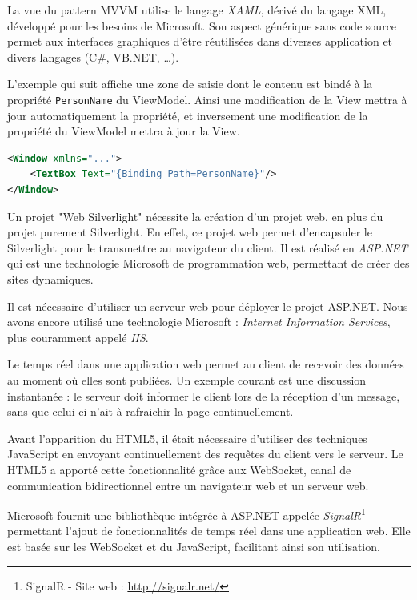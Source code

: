 La vue du pattern MVVM utilise le langage \textit{XAML}, dérivé du langage XML, développé pour les besoins de Microsoft.
Son aspect générique sans code source permet aux interfaces graphiques d'être réutilisées dans diverses application et divers langages (C\#, VB.NET, \ldots).

L'exemple qui suit affiche une zone de saisie dont le contenu est bindé à la propriété \lstinline{PersonName} du ViewModel.
Ainsi une modification de la View mettra à jour automatiquement la propriété, et inversement une modification de la propriété du ViewModel mettra à jour la View.
\begin{lstlisting}[language = xml]
<Window xmlns="...">
	<TextBox Text="{Binding Path=PersonName}"/>
</Window>
\end{lstlisting}



Un projet "Web Silverlight" nécessite la création d'un projet web, en plus du projet purement Silverlight.
En effet, ce projet web permet d'encapsuler le Silverlight pour le transmettre au navigateur du client.
Il est réalisé en \textit{ASP.NET} qui est une technologie Microsoft de programmation web, permettant de créer des sites dynamiques.

Il est nécessaire d'utiliser un serveur web pour déployer le projet ASP.NET.
Nous avons encore utilisé une technologie Microsoft : \textit{Internet Information Services}, plus couramment appelé \textit{IIS}.



Le temps réel dans une application web permet au client de recevoir des données au moment où elles sont publiées.
Un exemple courant est une discussion instantanée : le serveur doit informer le client lors de la réception d'un message, sans que celui-ci n'ait à rafraichir la page continuellement.

Avant l'apparition du HTML5, il était nécessaire d'utiliser des techniques JavaScript en envoyant continuellement des requêtes du client vers le serveur.
Le HTML5 a apporté cette fonctionnalité grâce aux WebSocket, canal de communication bidirectionnel entre un navigateur web et un serveur web.

Microsoft fournit une bibliothèque intégrée à ASP.NET appelée \textit{SignalR}\footnote{SignalR - Site web : \url{http://signalr.net/}} permettant l'ajout de fonctionnalités de temps réel dans une application web.
Elle est basée sur les WebSocket et du JavaScript, facilitant ainsi son utilisation.